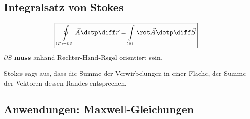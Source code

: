 



\subsection{Integralsatz von Stokes}
\[
    \boxed{\oint\limits_{\scriptscriptstyle (C) = \partial S} \vec{A} \dotp \diff \vec{r} = \int\limits_{\scriptscriptstyle (S)} \rot \vec{A} \dotp \diff \vec{S}}
\]
$\partial S$ \textbf{muss} anhand Rechter-Hand-Regel orientiert sein.

Stokes sagt aus, dass die Summe der Verwirbelungen in einer Fläche, der Summe der Vektoren dessen Randes entsprechen.

\subsection{Anwendungen: Maxwell-Gleichungen}


